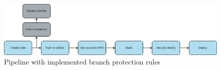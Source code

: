 

\vspace{2mm}
\begin{figure}[H]
    \centering
    \includegraphics[width=0.8\columnwidth]{Images/pipeline6.png}
    \caption{Pipeline with implemented branch protection rules}
    \label{fig: Pipeline with implemented branch protection rules}
\end{figure}


